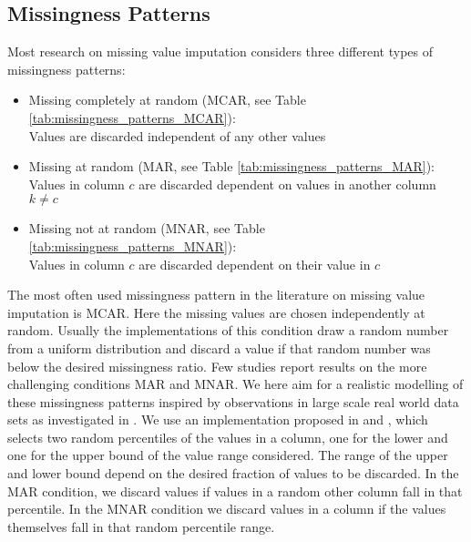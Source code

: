 \subsection{Missingness Patterns}
\label{sec:missingess_pattern}
Most research on missing value imputation considers three different types of missingness patterns:
%
\begin{itemize}
\item Missing completely at random (MCAR, see Table \ref{tab:missingness_patterns_MCAR}): \\
Values are discarded independent of any other values
\item Missing at random (MAR, see Table \ref{tab:missingness_patterns_MAR}): \\
Values in column $c$ are discarded dependent on values in another column $k\neq c$
\item Missing not at random (MNAR, see Table \ref{tab:missingness_patterns_MNAR}): \\
Values in column $c$ are discarded dependent on their value in $c$
\end{itemize}
%
The most often used missingness pattern in the literature on missing value imputation is MCAR. Here the missing values are chosen independently at random. Usually the implementations of this condition draw a random number from a uniform distribution and discard a value if that random number was below the desired missingness ratio. Few studies report results on the more challenging conditions MAR and MNAR. We here aim for a realistic modelling of these missingness patterns inspired by observations in large scale real world data sets as investigated in \cite{Biessmann2018a}. We use an implementation proposed in \cite{Schelter2020a} and \cite{Jenga}, which selects two random percentiles of the values in a column, one for the lower and one for the upper bound of the value range considered. The range of the upper and lower bound depend on the desired fraction of values to be discarded. In the MAR condition, we discard values if values in a random other column fall in that percentile. In the MNAR condition we discard values in a column if the values themselves fall in that random percentile range.
%
